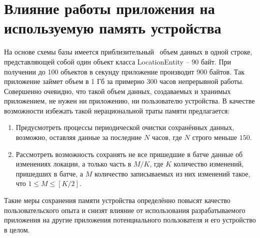 \section{Влияние работы приложения на используемую память устройства}
На основе схемы базы имеется приблизительный~\autocite{sqlite_datatypes} объем данных в одной строке, представляющей собой один объект класса LocationEntity – 90 байт. При получении до 100 объектов в секунду приложение производит 900 байтов. Так приложение займет объем в 1 Гб за примерно 300 часов непрерывной работы. Совершенно очевидно, что такой объем данных, создаваемых и хранимых приложением, не нужен ни приложению, ни пользователю устройства. 
В качестве возможности избежать такой нерациональной траты памяти предлагается:
\begin{enumerate}
	\item Предусмотреть процессы периодической очистки сохранённых данных, возможно, оставляя данные за последние $N$ часов, где $N$ строго меньше $150$.
	\item Рассмотреть возможность сохранять не все пришедшие в батче данные об изменениях локации, а только часть в $M/K$, где $K$ \textemdash\space количество изменений, пришедших в батче, а $M$ \textemdash\space количество записываемых из них изменений такое, что $1 \le M \le [K/2]$.
\end{enumerate}
Такие меры сохранения памяти устройства определённо повысят качество пользовательского опыта и снизят влияние от использования разрабатываемого приложения на другие приложения потенциального пользователя и его устройство в целом.
